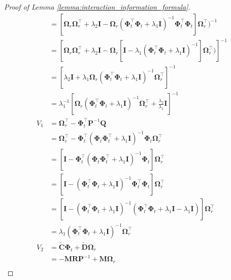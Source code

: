 \begin{proof}[Proof of Lemma \ref{lemma:interaction_information_formula}]
\begin{align}
            &= \left[\boldsymbol{\Omega}_r \boldsymbol{\Omega}_r^\top  + \lambda_2\mathbf{I} - \boldsymbol{\Omega}_r (\boldsymbol{\Phi}_t^\top \boldsymbol{\Phi}_t+ \lambda_1\mathbf{I})^{-1} \boldsymbol{\Phi}_t^\top \boldsymbol{\Phi}_t \right] \boldsymbol{\Omega}_r^\top)^{-1} \\ 
            &= \left[\boldsymbol{\Omega}_r \boldsymbol{\Omega}_r^\top  + \lambda_2\mathbf{I} - \boldsymbol{\Omega}_r \left[ \mathbf{I} - \lambda_1(\boldsymbol{\Phi}_t^\top \boldsymbol{\Phi}_t+ \lambda_1\mathbf{I})^{-1} \right] \boldsymbol{\Omega}_r^\top)\right]^{-1} \\ 
            &= \left[\lambda_2\mathbf{I} + \lambda_1\boldsymbol{\Omega}_r(\boldsymbol{\Phi}_t^\top \boldsymbol{\Phi}_t+ \lambda_1\mathbf{I})^{-1}\boldsymbol{\Omega}_r^\top\right]^{-1} \\
            &= \lambda_1^{-1} \left[\boldsymbol{\Omega}_r(\boldsymbol{\Phi}_t^\top \boldsymbol{\Phi}_t+ \lambda_1\mathbf{I})^{-1}\boldsymbol{\Omega}_r^\top + \frac{\lambda_2} {\lambda_1} \mathbf{I}\right]^{-1} \\
            V_1 & = \boldsymbol{\Omega}_r^\top - \boldsymbol{\Phi}_t^\top \mathbf{P}^{-1} \mathbf{Q}\\
            & = \boldsymbol{\Omega}_r^\top - \boldsymbol{\Phi}_t^\top (\boldsymbol{\Phi}_t\boldsymbol{\Phi}_t^\top + \lambda_1\mathbf{I})^{-1} \boldsymbol{\Phi}_t \boldsymbol{\Omega}_r^\top \\
            &=\left[ \mathbf{I} - \boldsymbol{\Phi}_t^\top (\boldsymbol{\Phi}_t\boldsymbol{\Phi}_t^\top + \lambda_1\mathbf{I})^{-1} \boldsymbol{\Phi}_t\right] \boldsymbol{\Omega}_r^\top \\
            & = \left[ \mathbf{I} - (\boldsymbol{\Phi}_t^\top\boldsymbol{\Phi}_t + \lambda_1\mathbf{I})^{-1} \boldsymbol{\Phi}_t^\top\boldsymbol{\Phi}_t\right] \boldsymbol{\Omega}_r^\top \\
            & = \left[ \mathbf{I} - (\boldsymbol{\Phi}_t^\top\boldsymbol{\Phi}_t + \lambda_1\mathbf{I})^{-1} (\boldsymbol{\Phi}_t^\top\boldsymbol{\Phi}_t +\lambda_1 \mathbf{I} - \lambda_1 \mathbf{I})\right] \boldsymbol{\Omega}_r^\top \\
            & = \lambda_1(\boldsymbol{\Phi}_t^\top\boldsymbol{\Phi}_t + \lambda_1\mathbf{I})^{-1} \boldsymbol{\Omega}_r^\top \\
            V_2 & = \widetilde{\mathbf{C}}\boldsymbol{\Phi}_t  + \widetilde{\mathbf{D}}\boldsymbol{\Omega}_r \\
            & = -\mathbf{M}\mathbf{R}\mathbf{P}^{-1} + \mathbf{M}\boldsymbol{\Omega}_r \\

\end{align}
\end{proof}
